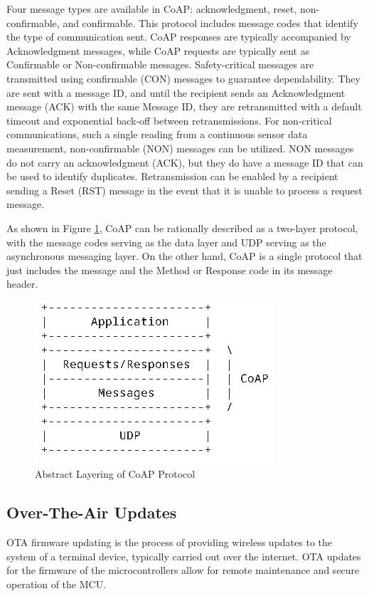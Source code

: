 Four message types are available in \acrshort{CoAP}: acknowledgment, reset, non-confirmable, and confirmable. This protocol includes message codes that identify the type of communication sent. \acrshort{CoAP} responses are typically accompanied by Acknowledgment messages, while \acrshort{CoAP} requests are typically sent as Confirmable or Non-confirmable messages. Safety-critical messages are transmitted using confirmable (CON) messages to guarantee dependability. They are sent with a message ID, and until the recipient sends an Acknowledgment message (ACK) with the same Message ID, they are retransmitted with a default timeout and exponential back-off between retransmissions. For non-critical communications, such a single reading from a continuous sensor data measurement, non-confirmable (NON) messages can be utilized.  NON messages do not carry an acknowledgment (ACK), but they do have a message ID that can be used to identify duplicates. Retransmission can be enabled by a recipient sending a Reset (RST) message in the event that it is unable to process a request message.

As shown in Figure \ref{fig:coap_format}, \acrshort{CoAP} can be rationally described as a two-layer protocol, with the message codes serving as the data layer and UDP serving as the asynchronous messaging layer. On the other hand, \acrshort{CoAP} is a single protocol that just includes the message and the Method or Response code in its message header.
\begin{figure}
    \centering
    \includegraphics{images/CoAP Format.png}
    \caption{Abstract Layering of \acrshort{CoAP} Protocol \cite{rfc7252}}
    \label{fig:coap_format}
\end{figure}

\subsection{Over-The-Air Updates}
\acrfull{OTA} firmware updating is the process of providing wireless updates to the system of a terminal device, typically carried out over the internet. \acrshort{OTA} updates for the firmware of the microcontrollers allow for remote maintenance and secure operation of the MCU.

